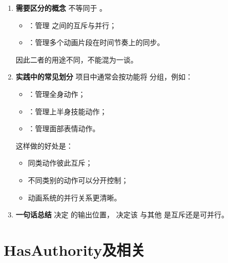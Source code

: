 \begin{enumerate}
\begin{enumerate}
		\item 挥刀动作：
		\begin{itemize}
			\item {}：
			\item {}：
		\end{itemize}
	\end{enumerate}
	
	若二者属于不同 ，则它们有机会同时存在；  
	若二者都属于同一个 ，则后播放的动作通常会打断前者。
	
	\item \textbf{需要区分的概念}
	 不等同于 。
	
	\begin{itemize}
		\item {}：管理  之间的互斥与并行；
		\item {}：管理多个动画片段在时间节奏上的同步。
	\end{itemize}
	
	因此二者的用途不同，不能混为一谈。
	
	\item \textbf{实践中的常见划分}
	项目中通常会按功能将  分组，例如：
	
	\begin{itemize}
		\item {}：管理全身动作；
		\item {}：管理上半身技能动作；
		\item {}：管理面部表情动作。
	\end{itemize}
	
	这样做的好处是：
	
	\begin{itemize}
		\item 同类动作彼此互斥；
		\item 不同类别的动作可以分开控制；
		\item 动画系统的并行关系更清晰。
	\end{itemize}
	
	\item \textbf{一句话总结}
	 决定  的输出位置，  
	 决定该  与其他  是互斥还是可并行。
\end{enumerate}

\chapter{HasAuthority及相关}
